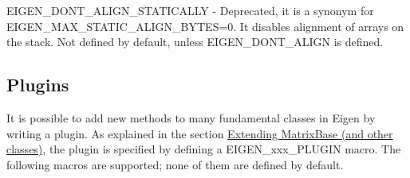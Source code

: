\begin{DoxyItemize}
\item {\ttfamily E\+I\+G\+E\+N\+\_\+\+D\+O\+N\+T\+\_\+\+A\+L\+I\+G\+N\+\_\+\+S\+T\+A\+T\+I\+C\+A\+L\+LY} -\/ Deprecated, it is a synonym for {\ttfamily E\+I\+G\+E\+N\+\_\+\+M\+A\+X\+\_\+\+S\+T\+A\+T\+I\+C\+\_\+\+A\+L\+I\+G\+N\+\_\+\+B\+Y\+T\+ES=0}. It disables alignment of arrays on the stack. Not defined by default, unless {\ttfamily E\+I\+G\+E\+N\+\_\+\+D\+O\+N\+T\+\_\+\+A\+L\+I\+GN} is defined.
\end{DoxyItemize}\hypertarget{_topic_preprocessor_directives_TopicPreprocessorDirectivesPlugins}{}\subsection{Plugins}\label{_topic_preprocessor_directives_TopicPreprocessorDirectivesPlugins}
It is possible to add new methods to many fundamental classes in Eigen by writing a plugin. As explained in the section \hyperlink{TopicCustomizing_Plugins}{Extending Matrix\+Base (and other classes)}, the plugin is specified by defining a {\ttfamily E\+I\+G\+E\+N\+\_\+xxx\+\_\+\+P\+L\+U\+G\+IN} macro. The following macros are supported; none of them are defined by default.


